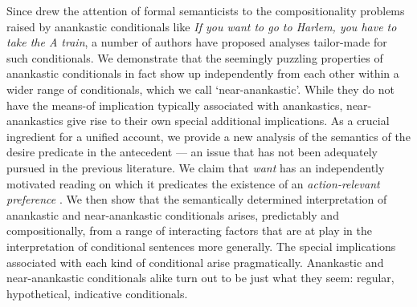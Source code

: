 Since \textcite{saebo1985-report,saebo2001-fery-sternefeld} drew the attention of formal semanticists to the compositionality problems raised by anankastic conditionals like \textit{If you want to go to Harlem, you have to take the A train}, a number of authors have proposed analyses tailor-made for such conditionals. We demonstrate that the seemingly puzzling properties of anankastic conditionals in fact show up independently from each other within a wider range of conditionals, which we call ‘near-anankastic’. While they do not have the means-of implication typically associated with anankastics, near-anankastics give rise to their own special additional implications. As a crucial ingredient for a unified account, we provide a new analysis of the semantics of the desire predicate in the antecedent — an issue that has not been adequately pursued in the previous literature. We claim that \textit{want} has an independently motivated reading on which it predicates the existence of an \textit{action-relevant preference} \parencite{condoravdi-lauer2011-sub,condoravdi-lauer2012-eiss,lauer2013-thesis}. We then show that the semantically determined interpretation of anankastic and near-anankastic conditionals arises, predictably and compositionally, from a range of interacting factors that are at play in the interpretation of conditional sentences more generally. The special implications associated with each kind of conditional arise pragmatically. Anankastic and near-anankastic conditionals alike turn out to be just what they seem: regular, hypothetical, indicative conditionals.
\endinput